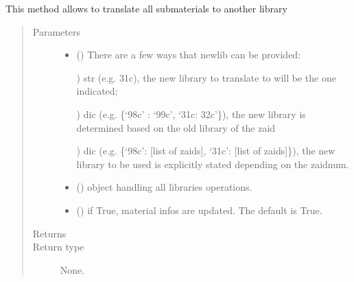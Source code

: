 \documentclass[letterpaper,10pt,english]{sphinxmanual}
\begin{document}
\begin{fulllineitems}
\begin{fulllineitems}
\label{\detokenize{api/inputgeneration:matreader.Material.translate}}
\sphinxAtStartPar
This method allows to translate all submaterials to another library
\begin{quote}\begin{description}
\item[{Parameters}] \leavevmode\begin{itemize}
\item {} 
\sphinxAtStartPar
{} () \textendash{} 
\sphinxAtStartPar
There are a few ways that newlib can be provided:

) str (e.g. 31c), the new library to translate to will be the
one indicated;

) dic (e.g. \{‘98c’ : ‘99c’, ‘31c: 32c’\}), the new library is
determined based on the old library of the zaid

) dic (e.g. \{‘98c’: {[}list of zaids{]}, ‘31c’: {[}list of zaids{]}\}),
the new library to be used is explicitly stated depending
on the zaidnum.


\item {} 
\sphinxAtStartPar
{} ({\hyperref[\detokenize{api/initobjects:libmanager.LibManager}]{}}) \textendash{} object handling all libraries operations.

\item {} 
\sphinxAtStartPar
{} (\sphinxstyleliteralemphasis{\sphinxupquote{, }}) \textendash{} if True, material infos are updated. The default is True.

\end{itemize}

\item[{Returns}] \leavevmode
\sphinxAtStartPar


\item[{Return type}] \leavevmode
\sphinxAtStartPar
None.


\end{description}
\end{quote}
\end{fulllineitems}
\end{fulllineitems}
\end{document}
